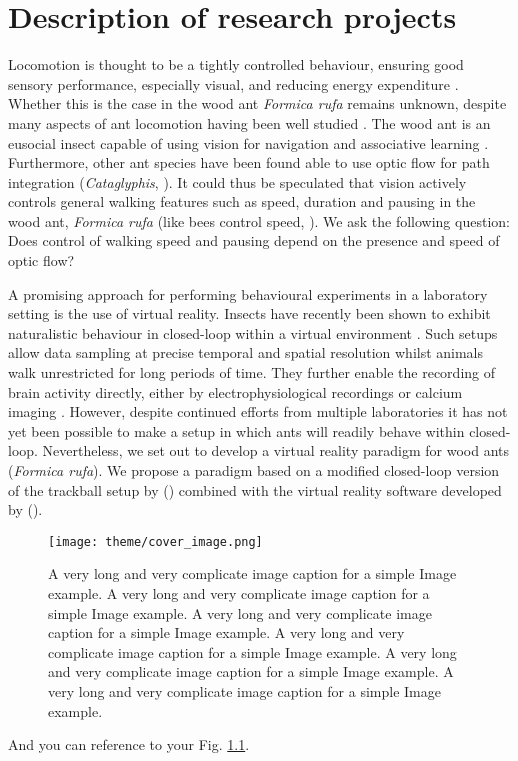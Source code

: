 \chapter{Description of research projects}
\label{chap:description-projects}

Locomotion is thought to be a tightly controlled behaviour, ensuring good sensory performance, especially visual, and reducing energy expenditure \autocites{Benichou2011IntermittentStrategies, Kramer2001}. Whether this is the case in the wood ant \textit{Formica rufa} remains unknown, despite many aspects of ant locomotion having been well studied \autocites{Lipp2005, Wahl2015}. The wood ant is an eusocial insect capable of using vision for navigation \autocite{Harris2007} and associative learning \autocite{Fernandes2017a}. Furthermore, other ant species have been found able to use optic flow for path integration (\textit{Cataglyphis}, \citealt{Ronacher1995, Pfeffer2016}). It could thus be speculated that vision actively controls general walking features such as speed, duration and pausing in the wood ant, \textit{Formica rufa} (like bees control speed, \cite{Schone1996, Linander2015}). We ask the following question: Does control of walking speed and pausing depend on the presence and speed of optic flow?

A promising approach for performing behavioural experiments in a laboratory setting is the use of virtual reality. Insects have recently been shown to exhibit naturalistic behaviour in closed-loop within a virtual environment \autocites{Takalo2012, Buatois2017, Seelig2010}. Such setups allow data sampling at precise temporal and spatial resolution whilst animals walk unrestricted for long periods of time. They further enable the recording of brain activity directly, either by electrophysiological recordings or calcium imaging \autocite{Seelig2010}. However, despite continued efforts from multiple laboratories it has not yet been possible to make a setup in which ants will readily behave within closed-loop. Nevertheless, we set out to develop a virtual reality paradigm for wood ants (\textit{Formica rufa}). We propose a paradigm based on a modified closed-loop version of the trackball setup by \citeauthor{Dahmen2017} (\citeyear{Dahmen2017}) combined with the virtual reality software developed by \citeauthor{Aronov2014b} (\citeyear{Aronov2014b}).

\begin{figure}[h]
    \centering
    \texttt{[image: theme/cover\_image.png]}
    \caption[short image caption for list of figures]{A very long and very complicate image caption for a simple Image example.
    A very long and very complicate image caption for a simple Image example.
    A very long and very complicate image caption for a simple Image example.
    A very long and very complicate image caption for a simple Image example.
    A very long and very complicate image caption for a simple Image example.
    A very long and very complicate image caption for a simple Image example.}
    \label{fig:image_example}
\end{figure}

And you can reference to your Fig. \ref{fig:image_example}.
